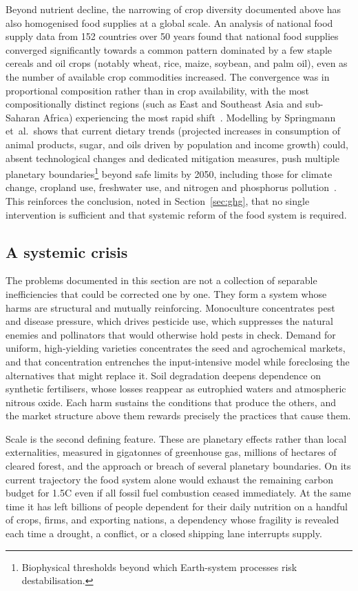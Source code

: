 Beyond nutrient decline, the narrowing of crop diversity documented above has also homogenised food supplies at a global scale. An analysis of national food supply data from 152 countries over 50 years found that national food supplies converged significantly towards a common pattern dominated by a few staple cereals and oil crops (notably wheat, rice, maize, soybean, and palm oil), even as the number of available crop commodities increased. The convergence was in proportional composition rather than in crop availability, with the most compositionally distinct regions (such as East and Southeast Asia and sub-Saharan Africa) experiencing the most rapid shift~\cite[Figure~3]{khoury2014homogeneity}. Modelling by Springmann et~al.\ shows that current dietary trends (projected increases in consumption of animal products, sugar, and oils driven by population and income growth) could, absent technological changes and dedicated mitigation measures, push multiple planetary boundaries\footnote{Biophysical thresholds beyond which Earth-system processes risk destabilisation.} beyond safe limits by 2050, including those for climate change, cropland use, freshwater use, and nitrogen and phosphorus pollution~\cite[p.~522]{springmann2018options}. This reinforces the conclusion, noted in Section~\ref{sec:ghg}, that no single intervention is sufficient and that systemic reform of the food system is required.

\subsection{A systemic crisis}

The problems documented in this section are not a collection of separable inefficiencies that could be corrected one by one. They form a system whose harms are structural and mutually reinforcing. Monoculture concentrates pest and disease pressure, which drives pesticide use, which suppresses the natural enemies and pollinators that would otherwise hold pests in check. Demand for uniform, high-yielding varieties concentrates the seed and agrochemical markets, and that concentration entrenches the input-intensive model while foreclosing the alternatives that might replace it. Soil degradation deepens dependence on synthetic fertilisers, whose losses reappear as eutrophied waters and atmospheric nitrous oxide. Each harm sustains the conditions that produce the others, and the market structure above them rewards precisely the practices that cause them.

Scale is the second defining feature. These are planetary effects rather than local externalities, measured in gigatonnes of greenhouse gas, millions of hectares of cleared forest, and the approach or breach of several planetary boundaries. On its current trajectory the food system alone would exhaust the remaining carbon budget for 1.5\textdegree{}C even if all fossil fuel combustion ceased immediately. At the same time it has left billions of people dependent for their daily nutrition on a handful of crops, firms, and exporting nations, a dependency whose fragility is revealed each time a drought, a conflict, or a closed shipping lane interrupts supply.

